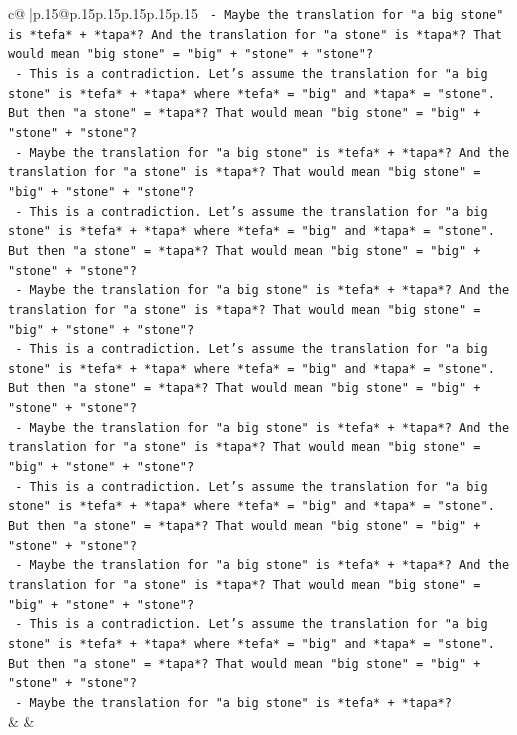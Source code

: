 \documentclass{article}
\begin{document}
{\begin{supertabular}{c@{$\;$}|p{.15\linewidth}@{}p{.15\linewidth}p{.15\linewidth}p{.15\linewidth}p{.15\linewidth}p{.15\linewidth}}
{{{\texttt{                {-} Maybe the translation for "a big stone" is *tefa* + *tapa*? And the translation for "a stone" is *tapa*? That would mean "big stone" = "big" + "stone" + "stone"?} \\
\texttt{                {-} This is a contradiction. Let's assume the translation for "a big stone" is *tefa* + *tapa* where *tefa* = "big" and *tapa* = "stone". But then "a stone" = *tapa*? That would mean "big stone" = "big" + "stone" + "stone"?} \\
\texttt{                {-} Maybe the translation for "a big stone" is *tefa* + *tapa*? And the translation for "a stone" is *tapa*? That would mean "big stone" = "big" + "stone" + "stone"?} \\
\texttt{                {-} This is a contradiction. Let's assume the translation for "a big stone" is *tefa* + *tapa* where *tefa* = "big" and *tapa* = "stone". But then "a stone" = *tapa*? That would mean "big stone" = "big" + "stone" + "stone"?} \\
\texttt{                {-} Maybe the translation for "a big stone" is *tefa* + *tapa*? And the translation for "a stone" is *tapa*? That would mean "big stone" = "big" + "stone" + "stone"?} \\
\texttt{                {-} This is a contradiction. Let's assume the translation for "a big stone" is *tefa* + *tapa* where *tefa* = "big" and *tapa* = "stone". But then "a stone" = *tapa*? That would mean "big stone" = "big" + "stone" + "stone"?} \\
\texttt{                {-} Maybe the translation for "a big stone" is *tefa* + *tapa*? And the translation for "a stone" is *tapa*? That would mean "big stone" = "big" + "stone" + "stone"?} \\
\texttt{                {-} This is a contradiction. Let's assume the translation for "a big stone" is *tefa* + *tapa* where *tefa* = "big" and *tapa* = "stone". But then "a stone" = *tapa*? That would mean "big stone" = "big" + "stone" + "stone"?} \\
\texttt{                {-} Maybe the translation for "a big stone" is *tefa* + *tapa*? And the translation for "a stone" is *tapa*? That would mean "big stone" = "big" + "stone" + "stone"?} \\
\texttt{                {-} This is a contradiction. Let's assume the translation for "a big stone" is *tefa* + *tapa* where *tefa* = "big" and *tapa* = "stone". But then "a stone" = *tapa*? That would mean "big stone" = "big" + "stone" + "stone"?} \\
\texttt{                {-} Maybe the translation for "a big stone" is *tefa* + *tapa*?} \\
            }
        }
    }
    & & \\ \\


\end{supertabular}}
\end{document}
